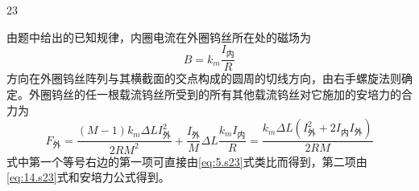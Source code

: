 \begin{solution}{23}
    \begin{subsolution}
        由题中给出的已知规律，内圈电流在外圈钨丝所在处的磁场为
        \begin{equation}
            B = k_m\frac{I_{\text{内}}}{R}
            \label{eq:14.s23}
        \end{equation}
        方向在外圈钨丝阵列与其横截面的交点构成的圆周的切线方向，由右手螺旋法则确定。外圈钨丝的任一根载流钨丝所受到的所有其他载流钨丝对它施加的安培力的合力为
        \begin{equation}
            F_{\text{外}} = \frac{(M-1)k_m \Delta L I_{\text{外}}^2}{2R M^2} + \frac{I_{\text{外}}}{M}\Delta L \frac{k_m I_{\text{内}}}{R} = \frac{k_m \Delta L (I_{\text{外}}^2 + 2I_{\text{内}}I_{\text{外}})}{2R M}
            \label{eq:15.s23}
        \end{equation}
        式中第一个等号右边的第一项可直接由\eqref{eq:5.s23}式类比而得到，第二项由\eqref{eq:14.s23}式和安培力公式得到。


\end{subsolution}
\end{solution}
